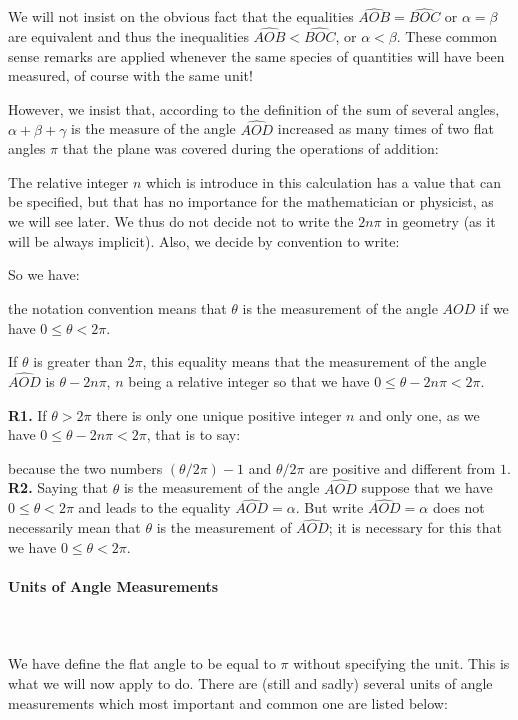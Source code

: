 	We will not insist on the obvious fact that the equalities $\widehat{AOB}=\widehat{BOC}$ or $\alpha=\beta$ are equivalent and thus the  inequalities $\widehat{AOB}<\widehat{BOC}$, or $\alpha<\beta$. These common sense remarks are applied whenever the same species of quantities will have been measured, of course with the same unit!
	
	However, we insist that, according to the definition of the sum of several angles, $\alpha+\beta+\gamma$ is the measure of the angle $\widehat{AOD}$ increased as many times of two flat angles $\pi$ that the plane was covered during the operations of addition:
	
	The relative integer $n$ which is introduce in this calculation has a value that can be specified, but that has no importance for the mathematician or physicist, as we will see later. We thus do not decide not to write the $2n\pi$ in geometry (as it will be always implicit). Also, we decide by convention to write:
	
	So we have:
	
	the notation convention means that $\theta$ is the measurement of the angle $\widehat{AOD}$ if we have $0\leq \theta <2\pi$.
	
	If $\theta$ is greater than $2\pi$, this equality means that the measurement of the angle $\widehat{AOD}$ is $\theta-2n\pi$, $n$ being a relative integer so that we have $0 \leq \theta-2n\pi <2\pi$.
	\begin{tcolorbox}[title=Remarks,colframe=black,arc=10pt]
	\textbf{R1.} If $\theta>2\pi$ there is only one unique positive integer $n$ and only one, as we have $0\leq \theta-2n\pi<2\pi$, that is to say:
	
	because the two numbers $(\theta/2\pi)-1$ and $\theta/2\pi$ are positive and different from $1$.\\
	
	\textbf{R2.} Saying that $\theta$ is the measurement of the angle $\widehat{AOD}$ suppose that we have $0\leq \theta<2\pi$ and leads to the equality $\widehat{AOD}=\alpha$. But write $\widehat{AOD}=\alpha$ does not necessarily mean that $\theta$ is the measurement of $\widehat{AOD}$; it is necessary for this that we have $0\leq \theta<2\pi$.
	\end{tcolorbox}
	
	\paragraph{Units of Angle Measurements}\mbox{}\\\\
	We have define the flat angle to be equal to $\pi$ without specifying the unit. This is what we will now apply to do. There are (still and sadly) several units of angle measurements which most important and common one are listed below:

